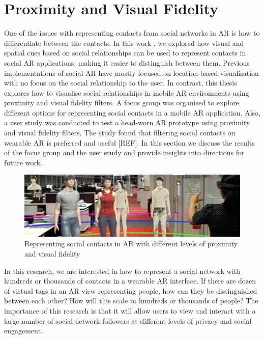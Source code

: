 \section{Proximity and Visual Fidelity}
\label{sec:contacts:visualising}

One of the issues with representing contacts from social networks in AR is how to differentiate between the contacts. In this work \cite{Nassani2017b}, we explored how visual and spatial cues based on social relationships can be used to represent contacts in social AR applications, making it easier to distinguish between them. Previous implementations of social AR have mostly focused on location-based visualisation with no focus on the social relationship to the user. In contrast, this thesis explores how to visualise social relationships in mobile AR environments using proximity and visual fidelity filters. A focus group was organised to explore different options for representing social contacts in a mobile AR application. Also, a user study was conducted to test a head-worn AR prototype using proximity and visual fidelity filters. The study found that filtering social contacts on wearable AR is preferred and useful [REF].  In this section we discuss the results of the focus group and the user study and provide insights into directions for future work.

\begin{figure}[ht]
  \includegraphics[width=\linewidth]{images/mgia17/20170618_031128_HoloLens_cropped}
  \caption{Representing social contacts in AR with different levels of proximity and visual fidelity}
  \label{fig:contacts:overview}
\end{figure}

In this research, we are interested in how to represent a social network with hundreds or thousands of contacts in a wearable AR interface. If there are dozen of virtual tags in an AR view representing people, how can they be distinguished between each other? How will this scale to hundreds or thousands of people? The importance of this research is that it will allow users to view and interact with a large number of social network followers at different levels of privacy and social engagement.

